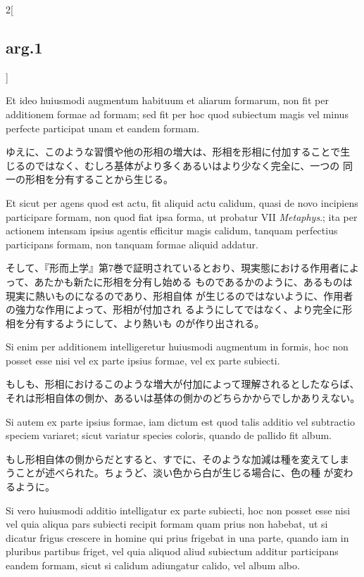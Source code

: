 \documentclass[paper=a4paper,fontsize=10pt,jafontsize=9pt,titlepage]{jlreq}
\begin{document}
\begin{paracol}{2}[\subsection{arg.1}]
\switchcolumn*

Et ideo huiusmodi augmentum habituum et aliarum formarum,
non fit per additionem formae ad formam; sed fit per hoc quod
subiectum magis vel minus perfecte participat unam et eandem
formam.

\switchcolumn

ゆえに、このような習慣や他の形相の増大は、形相を形相に付加することで生
 じるのではなく、むしろ基体がより多くあるいはより少なく完全に、一つの
 同一の形相を分有することから生じる。

\switchcolumn*

Et sicut per agens quod est actu, fit aliquid actu calidum,
quasi de novo incipiens participare formam, non quod fiat ipsa forma,
ut probatur VII {\itshape Metaphys}.; ita per actionem intensam ipsius agentis
efficitur magis calidum, tanquam perfectius participans formam, non
tanquam formae aliquid addatur.

\switchcolumn

そして、『形而上学』第7巻で証明されているとおり、現実態における作用者によって、あたかも新たに形相を分有し始める
ものであるかのように、あるものは現実に熱いものになるのであり、形相自体
 が生じるのではないように、作用者の強力な作用によって、形相が付加され
 るようにしてではなく、より完全に形相を分有するようにして、より熱いも
 のが作り出される。

\switchcolumn*

Si enim per additionem intelligeretur
huiusmodi augmentum in formis, hoc non posset esse nisi vel ex parte
ipsius formae, vel ex parte subiecti.

\switchcolumn

もしも、形相におけるこのような増大が付加によって理解されるとしたならば、
それは形相自体の側か、あるいは基体の側かのどちらかからでしかありえない。

\switchcolumn*

Si autem ex parte ipsius formae,
iam dictum est quod talis additio vel subtractio speciem variaret;
sicut variatur species coloris, quando de pallido fit album.

\switchcolumn

もし形相自体の側からだとすると、すでに、そのような加減は種を変えてしま
うことが述べられた。ちょうど、淡い色から白が生じる場合に、色の種
が変わるように。

\switchcolumn*

Si vero
huiusmodi additio intelligatur ex parte subiecti, hoc non posset esse
nisi vel quia aliqua pars subiecti recipit formam quam prius non
habebat, ut si dicatur frigus crescere in homine qui prius frigebat in
una parte, quando iam in pluribus partibus friget, vel quia aliquod
aliud subiectum additur participans eandem formam, sicut si calidum
adiungatur calido, vel album albo.


\end{paracol}
\end{document}
